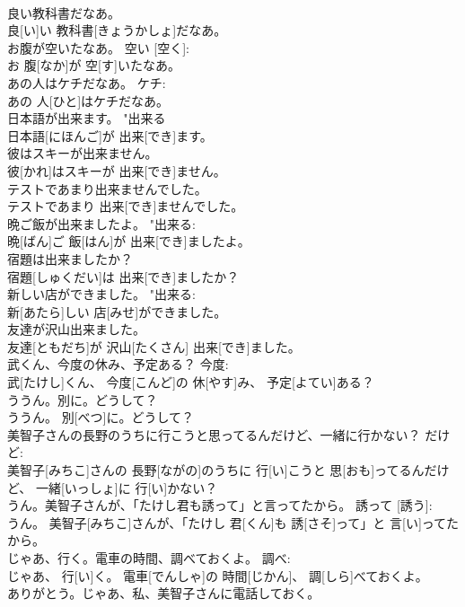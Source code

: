 \documentclass[8pt]{extreport}
\begin{document}
\begin{CJK}{UTF8}{min}
\\	良い教科書だなあ。	
\\	良[い]い 教科書[きょうかしょ]だなあ。	
\\	お腹が空いたなあ。	空い [空く]: 
\\	お 腹[なか]が 空[す]いたなあ。	
\\	あの人はケチだなあ。	ケチ: 
\\	あの 人[ひと]はケチだなあ。	
\\	日本語が出来ます。	"出来る 
\\	日本語[にほんご]が 出来[でき]ます。	
\\	彼はスキーが出来ません。	
\\	彼[かれ]はスキーが 出来[でき]ません。	
\\	テストであまり出来ませんでした。	
\\	テストであまり 出来[でき]ませんでした。	
\\	晩ご飯が出来ましたよ。	"出来る: 
\\	晩[ばん]ご 飯[はん]が 出来[でき]ましたよ。	
\\	宿題は出来ましたか？	
\\	宿題[しゅくだい]は 出来[でき]ましたか？	
\\	新しい店ができました。	"出来る: 
\\	新[あたら]しい 店[みせ]ができました。	
\\	友達が沢山出来ました。	
\\	友達[ともだち]が 沢山[たくさん] 出来[でき]ました。	
\\	武くん、今度の休み、予定ある？	今度: 
\\	武[たけし]くん、 今度[こんど]の 休[やす]み、 予定[よてい]ある？	
\\	ううん。別に。どうして？	
\\	ううん。 別[べつ]に。どうして？	
\\	美智子さんの長野のうちに行こうと思ってるんだけど、一緒に行かない？	だけど: 
\\	美智子[みちこ]さんの 長野[ながの]のうちに 行[い]こうと 思[おも]ってるんだけど、 一緒[いっしょ]に 行[い]かない？	
\\	うん。美智子さんが、「たけし君も誘って」と言ってたから。	誘って [誘う]: 
\\	うん。 美智子[みちこ]さんが、「たけし 君[くん]も 誘[さそ]って」と 言[い]ってたから。	
\\	じゃあ、行く。電車の時間、調べておくよ。	調べ: 
\\	じゃあ、 行[い]く。 電車[でんしゃ]の 時間[じかん]、 調[しら]べておくよ。	
\\	ありがとう。じゃあ、私、美智子さんに電話しておく。	

\end{CJK}
\end{document}
